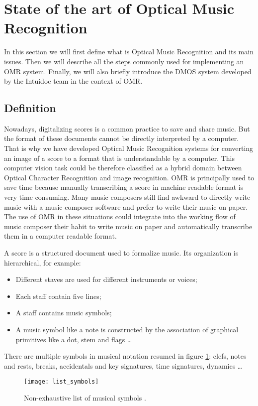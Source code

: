 \documentclass[11pt]{sdm}
\begin{document}
\section{State of the art of Optical Music Recognition}

In this section we will first define what is Optical Music Recognition and its main issues.
Then we will describe all the steps commonly used for implementing an OMR system.
Finally, we will also briefly introduce the DMOS system developed by the Intuidoc team in the context of OMR.

\subsection{Definition}

Nowadays, digitalizing scores is a common practice to save and share music.
But the format of these documents cannot be directly interpreted by a computer.
That is why we have developed Optical Music Recognition systems for converting an image of a score to a format that is understandable by a computer.
This computer vision task could be therefore classified as a hybrid domain between Optical Character Recognition and image recognition.
OMR is principally used to save time because manually transcribing a score in machine readable format is very time consuming.
Many music composers still find awkward to directly write music with a music composer software and prefer to write their music on paper.
The use of OMR in these situations could integrate into the working flow of music composer their habit to write music on paper and automatically transcribe them in a computer readable format.

A score is a structured document used to formalize music.
Its organization is hierarchical, for example:
\begin{itemize}
  \item Different staves are used for different instruments or voices;
  \item Each staff contain five lines;
  \item A staff contains music symbols;
  \item A music symbol like a note is constructed by the association of graphical primitives like a dot, stem and flags \ldots
\end{itemize}
There are multiple symbols in musical notation resumed in figure \ref{list_symbols}: clefs, notes and rests, breaks, accidentals and key signatures, time signatures, dynamics \ldots 
\begin{figure}[btp]
  \texttt{[image: list\_symbols]}
  \caption{\label{list_symbols} Non-exhaustive list of musical symbols \cite{fornes_analysis_2014}. }
\end{figure}
\end{document}
